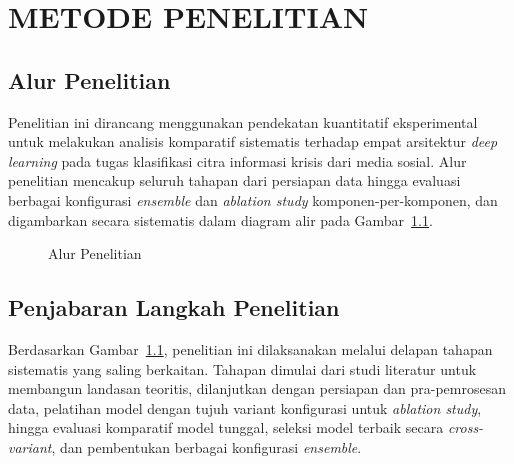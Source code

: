 \newpage
\chapter{METODE PENELITIAN} \label{Bab III}

\section{Alur Penelitian} \label{III.Alur}
Penelitian ini dirancang menggunakan pendekatan kuantitatif eksperimental
untuk melakukan analisis komparatif sistematis terhadap empat arsitektur
\textit{deep learning} pada tugas klasifikasi citra informasi krisis dari
media sosial. Alur penelitian mencakup seluruh tahapan dari persiapan data
hingga evaluasi berbagai konfigurasi \textit{ensemble} dan \textit{ablation
study} komponen-per-komponen, dan digambarkan secara sistematis dalam
diagram alir pada Gambar~\ref{fig:3.alur}. \par

\begin{figure}[H]
    \centering
    \fbox{\rule{0pt}{12cm}\rule{0.5\textwidth}{0pt}}
    \caption{Alur Penelitian}
    \label{fig:3.alur}
\end{figure}


\section{Penjabaran Langkah Penelitian} \label{III.Jabar Alur}
Berdasarkan Gambar~\ref{fig:3.alur}, penelitian ini dilaksanakan melalui
delapan tahapan sistematis yang saling berkaitan. Tahapan dimulai dari
studi literatur untuk membangun landasan teoritis, dilanjutkan dengan
persiapan dan pra-pemrosesan data, pelatihan model dengan tujuh variant
konfigurasi untuk \textit{ablation study}, hingga evaluasi komparatif
model tunggal, seleksi model terbaik secara \textit{cross-variant}, dan
pembentukan berbagai konfigurasi \textit{ensemble}. \par

